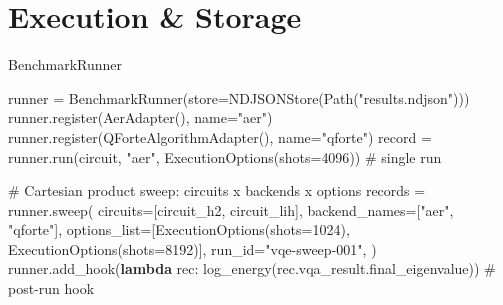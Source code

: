 \documentclass[
  ignorenonframetext,
  aspectratio=169,
]{beamer}
\newenvironment{Shaded}{\begin{snugshade}}{\end{snugshade}}
\newcommand{\CommentTok}[1]{\textcolor[rgb]{0.48,0.49,0.49}{#1}}
\newcommand{\DecValTok}[1]{\textcolor[rgb]{0.96,0.45,0.00}{#1}}
\newcommand{\KeywordTok}[1]{\textcolor[rgb]{0.81,0.81,0.76}{\textbf{#1}}}
\newcommand{\NormalTok}[1]{\textcolor[rgb]{0.81,0.81,0.76}{#1}}
\newcommand{\OperatorTok}[1]{\textcolor[rgb]{0.81,0.81,0.76}{#1}}
\newcommand{\StringTok}[1]{\textcolor[rgb]{0.96,0.31,0.31}{#1}}
\begin{document}
\section{Execution \& Storage}\label{execution-storage}

\begin{frame}[fragile]{BenchmarkRunner}
\label{benchmarkrunner}
\scriptsize

\begin{Shaded}
\begin{Highlighting}[]
\NormalTok{runner }\OperatorTok{=}\NormalTok{ BenchmarkRunner(store}\OperatorTok{=}\NormalTok{NDJSONStore(Path(}\StringTok{"results.ndjson"}\NormalTok{)))}
\NormalTok{runner.register(AerAdapter(), name}\OperatorTok{=}\StringTok{"aer"}\NormalTok{)}
\NormalTok{runner.register(QForteAlgorithmAdapter(), name}\OperatorTok{=}\StringTok{"qforte"}\NormalTok{)}
\NormalTok{record }\OperatorTok{=}\NormalTok{ runner.run(circuit, }\StringTok{"aer"}\NormalTok{, ExecutionOptions(shots}\OperatorTok{=}\DecValTok{4096}\NormalTok{))   }\CommentTok{\# single run}

\CommentTok{\# Cartesian product sweep: circuits x backends x options}
\NormalTok{records }\OperatorTok{=}\NormalTok{ runner.sweep(}
\NormalTok{    circuits}\OperatorTok{=}\NormalTok{[circuit\_h2, circuit\_lih], backend\_names}\OperatorTok{=}\NormalTok{[}\StringTok{"aer"}\NormalTok{, }\StringTok{"qforte"}\NormalTok{],}
\NormalTok{    options\_list}\OperatorTok{=}\NormalTok{[ExecutionOptions(shots}\OperatorTok{=}\DecValTok{1024}\NormalTok{), ExecutionOptions(shots}\OperatorTok{=}\DecValTok{8192}\NormalTok{)],}
\NormalTok{    run\_id}\OperatorTok{=}\StringTok{"vqe{-}sweep{-}001"}\NormalTok{,}
\NormalTok{)}
\NormalTok{runner.add\_hook(}\KeywordTok{lambda}\NormalTok{ rec: log\_energy(rec.vqa\_result.final\_eigenvalue))   }\CommentTok{\# post{-}run hook}
\end{Highlighting}
\end{Shaded}

\normalsize
\end{frame}
\end{document}
